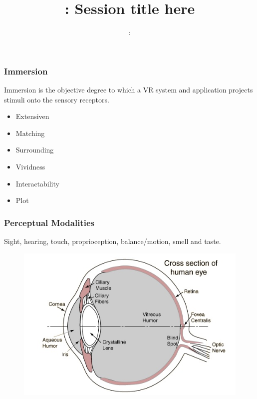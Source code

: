 \usepackage{../../beamerthemeFalmouthGamesAcademy}
\usepackage{multimedia}
\graphicspath{ {../../} }


\usepackage[normalem]{ulem}
\usepackage{wasysym}
\usepackage{gensymb}
\usepackage{pdfpages}

\usetikzlibrary{arrows,automata}




\title{\sessionnumber: Session title here}
\subtitle{\modulecode: \moduletitle}

\frame{\titlepage} 

\begin{frame}
	\frametitle{Immersion}
	Immersion is the objective degree to which a VR system and application projects stimuli onto the sensory receptors. 

	\begin{itemize}
		\item Extensiven
		\item Matching
		\item Surrounding
		\item Vividness
		\item Interactability
		\item Plot
	\end{itemize}
\end{frame}

\begin{frame}
	\frametitle{Perceptual Modalities}
	
	Sight, hearing, touch, proprioception, balance/motion, smell and taste. 
		
\end{frame}

\begin{frame}
	\begin{figure}
		\includegraphics[scale=.6]{assets/eye} 
		\caption{}
	\end{figure}
\end{frame}


